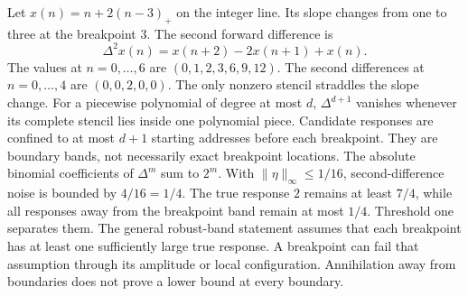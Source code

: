 Let $x(n)=n+2(n-3)_+$ on the integer line. Its slope changes from one to three at the breakpoint $3$. The second forward difference is
\[
\Delta^2x(n)=x(n+2)-2x(n+1)+x(n).
\]
The values at $n=0,\ldots,6$ are $(0,1,2,3,6,9,12)$. The second differences at $n=0,\ldots,4$ are $(0,0,2,0,0)$. The only nonzero stencil straddles the slope change.
For a piecewise polynomial of degree at most $d$, $\Delta^{d+1}$ vanishes whenever its complete stencil lies inside one polynomial piece. Candidate responses are confined to at most $d+1$ starting addresses before each breakpoint. They are boundary bands, not necessarily exact breakpoint locations.
The absolute binomial coefficients of $\Delta^m$ sum to $2^m$. With $\|\eta\|_\infty\le1/16$, second-difference noise is bounded by $4/16=1/4$. The true response $2$ remains at least $7/4$, while all responses away from the breakpoint band remain at most $1/4$. Threshold one separates them.
The general robust-band statement assumes that each breakpoint has at least one sufficiently large true response. A breakpoint can fail that assumption through its amplitude or local configuration. Annihilation away from boundaries does not prove a lower bound at every boundary.

